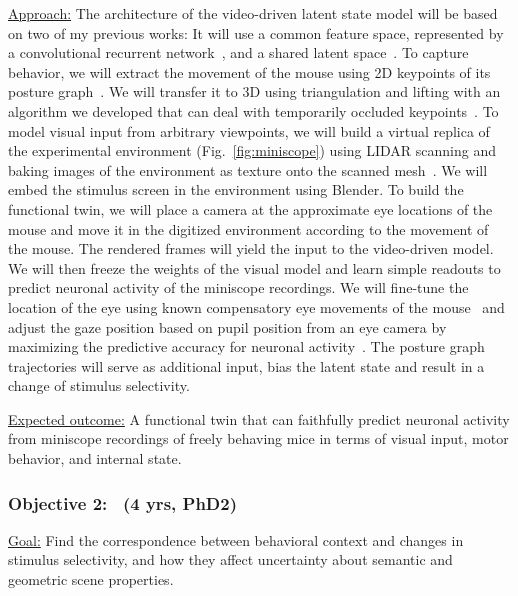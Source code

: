 \documentclass[COG,11pt]{ercgrant}
\begin{document}
\underline{Approach:} 
The architecture of the video-driven latent state model will be based on two of my previous works: It will use a common feature space, represented by a convolutional recurrent network~\parencite{Sinz2018-sk}, and a shared latent space~\parencite{Bashiri2021-or}. 
To capture behavior, we will extract the movement of the mouse using 2D keypoints of its posture graph~\parencite{Mathis2018-lk}. 
We will transfer it to 3D using triangulation and lifting  with an algorithm we developed that can deal with temporarily occluded keypoints~\parencite{Pierzchlewicz2022-tq}. 
To model visual input from arbitrary viewpoints, we will build a virtual replica of the experimental environment (Fig.~\ref{fig:miniscope}) using LIDAR scanning and baking images of the environment as texture onto the scanned mesh~\parencite[Fig.~\ref{fig:replica}]{Holmgren2021-jv}. 
We will embed the stimulus screen in the environment using Blender.
To build the functional twin, we will place a camera at the approximate eye locations of the mouse and move it in the digitized environment according to the movement of the mouse. 
The rendered frames will yield the input to the video-driven model.
We will then freeze the weights of the visual model and learn simple readouts to predict neuronal activity of the miniscope recordings.
We will fine-tune the location of the eye using known compensatory eye movements of the mouse~\parencite{Wallace2013-lf} and adjust the gaze position based on pupil position from an eye camera by maximizing the predictive accuracy for neuronal activity~\parencite[similar to][]{Sinz2018-sk, Parker2022-ac}.
The posture graph trajectories will serve as additional input, bias the latent state and result in a change of stimulus selectivity. 

\underline{Expected outcome:} A functional twin that can faithfully predict neuronal activity from miniscope recordings of freely behaving mice in terms of visual input, motor behavior, and internal state.

\subsubsection{Objective 2:  \otwotitle~(4 yrs, PhD2)\hfill{}}
\underline{Goal:} Find the correspondence between behavioral context and changes in stimulus selectivity, and how they affect uncertainty about semantic and geometric scene properties. 
\end{document}
